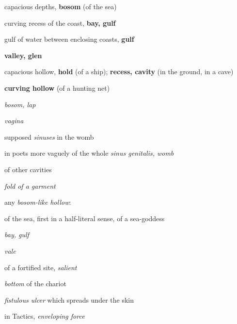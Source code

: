 \begin{compactdesc}
\begin{compactitem}
							\item[6] capacious depths, \textbf{bosom} (of the sea)
							\item[7] curving recess of the coast, \textbf{bay, gulf}
							\item[8] gulf of water between enclosing coasts, \textbf{gulf}
							\item[9] \textbf{valley, glen}
							\item[10] capacious hollow, \textbf{hold} (of a ship); \textbf{recess, cavity} (in the ground, in a cave)
							\item[11] \textbf{curving hollow} (of a hunting net)
						\end{compactitem}
					\item[LSJ 974a, PDF 1045] \textbf{}
						\begin{compactitem}
							\item[I.1] \textit{bosom, lap}
							\item[I.2.a] \textit{vagina}
							\item[I.2.b] supposed \textit{sinuses} in the womb
							\item[I.2.c] in poets more vaguely of the whole \textit{sinus genitalis, womb}
							\item[I.2.d] of other cavities
							\item[II] \textit{fold of a garment}
							\item[III] any \textit{bosom-like hollow}:
							\item[III.1] of the sea, first in a half-literal sense, of a sea-goddess
							\item[III.2] \textit{bay, gulf}
							\item[III.3] \textit{vale}
							\item[III.4] of a fortified site, \textit{salient}
							\item[III.5] \textit{bottom} of the chariot
							\item[III.6] \textit{fistulous ulcer} which spreads under the skin
							\item[IV] in Tactics, \textit{enveloping force}
						\end{compactitem}
				\end{compactdesc}
				
				
				
